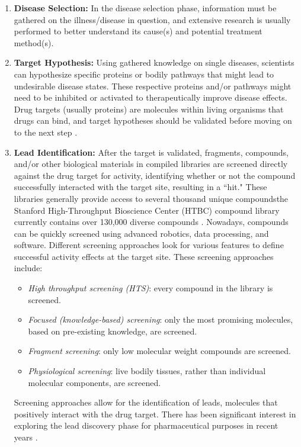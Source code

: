 \documentclass{IEEEtran}
\begin{document}
		\begin{enumerate}
			\item \textbf{Disease Selection:} In the disease selection phase, information must be gathered on the illness/disease in question, and extensive research is usually performed to better understand its cause(s) and potential treatment method(s). 
			\item \textbf{Target Hypothesis:} Using gathered knowledge on single diseases, scientists can hypothesize specific proteins or bodily pathways that might lead to undesirable disease states.  These respective proteins and/or pathways might need to be inhibited or activated to therapeutically improve disease effects.  Drug targets (usually proteins) are molecules within living organisms that drugs can bind, and target hypotheses should be validated before moving on to the next step \cite{xu}.
			\item \textbf{Lead Identification:} After the target is validated, fragments, compounds, and/or other biological materials in compiled libraries are screened directly against the drug target for activity, identifying whether or not the compound successfully interacted with the target site, resulting in a ``hit."  These libraries generally provide access to several thousand unique compounds\textemdash the Stanford High-Throughput Bioscience Center (HTBC) compound library currently contains over 130,000 diverse compounds \cite{stan}.  Nowadays, compounds can be quickly screened using advanced robotics, data processing, and software.  Different screening approaches look for various features to define successful activity effects at the target site.  These screening approaches include:
			\begin{itemize}
				\item \textit{High throughput screening (HTS)}: every compound in the library is screened.
				\item \textit{Focused (knowledge-based) screening}: only the most promising molecules, based on pre-existing knowledge, are screened.
				\item \textit{Fragment screening}: only low molecular weight compounds are screened.
				\item \textit{Physiological screening}: live bodily tissues, rather than individual molecular components, are screened.
			\end{itemize} 
			Screening approaches allow for the identification of leads, molecules that positively interact with the drug target.  There has been significant interest in exploring the lead discovery phase for pharmaceutical purposes in recent years \cite{hughes}.

\end{enumerate}
\end{document}
